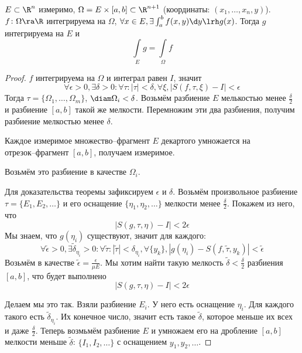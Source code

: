 \begin{theorem}
	$E \subset \R^n$ измеримо, $\Omega = E \times [a, b] \subset \R^{n+1}$ (координаты: $(x_1, \dots, x_n, y)$).
	$f\colon \Omega \ra \R$ интегрируема на $\Omega$, $\forall x \in E, \exists \int_a^b f(x,y) \d y \lrh g(x)$.
	Тогда $g$ интегрируема на $E$ и
	\[ \int\limits_E g = \int\limits_\Omega f \]
\end{theorem}
\begin{proof}
	$f$ интегрируема на $\Omega$ и интеграл равен $I$, значит
	\[
		\forall \epsilon > 0, \exists \delta > 0\colon \forall \tau\colon |\tau| < \delta,
		\forall \xi, \left|S(f,\tau,\xi) - I\right| < \epsilon
	\]
	Тогда $\tau = \{\Omega_1, \dots, \Omega_m\}$, $\diam \Omega_i < \delta$.
	Возьмём разбиение $E$ мелькостью менее $\frac\delta2$ и разбиение $[a, b]$ такой же мелкости.
	Перемножим эти два разбиения, получим разбиение мелкостью менее $\delta$.
	\begin{Rem}
		Каждое измеримое множество--фрагмент $E$ декартого умножается на \\отрезок--фрагмент $[a, b]$, получаем измеримое.
	\end{Rem}
	Возьмём это разбиение в качестве $\Omega_i$.

	Для доказательства теоремы зафиксируем $\epsilon$ и $\delta$.
	Возьмём произвольное разбиение \\$\tau = \{E_1, E_2, \dots\}$ и его оснащение $\{\eta_1, \eta_2, \dots\}$ мелкости менее $\frac\delta2$.
	Покажем из него, что
	\[
		\left| S(g, \tau, \eta) - I \right| < 2\epsilon
	\]
	Мы знаем, что $g(\eta_i)$ существуют, значит для каждого:
	\[
		\forall \tilde\epsilon>0, \exists \tilde\delta_{\eta_i} > 0\colon \forall \tilde\tau\colon |\tilde\tau| < \delta_{\eta_i},
		\forall \{y_k\}, \left| g(\eta_i) - S(f, \tilde\tau, y_k) \right| < \tilde\epsilon
	\]
	Возьмём в качестве $\tilde\epsilon = \frac\epsilon{\mu E}$.
	Мы хотим найти такую мелкость $\tilde\delta < \frac\delta2$ разбиения $[a, b]$, что будет выполнено
	\[
		\left| S(g, \tau, \eta) - I \right| < 2\epsilon
	\]

	Делаем мы это так.
	Взяли разбиение $E_i$.
	У него есть оснащение $\eta_i$.
	Для каждого такого есть $\tilde\delta_{\eta_i}$.
	Их конечное число, значит есть такое $\tilde\delta$, которое меньше их всех и даже $\frac\delta2$.
	Теперь возмьмём разбиение $E$ и умножаем его на дробление $[a, b]$ мелкости меньше $\tilde\delta$:
	$\{I_1, I_2, \dots\}$ с оснащением ${y_1, y_2, \dots}$.


\end{proof}
